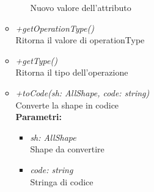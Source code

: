 \begin{itemize}
\begin{itemize}
\begin{itemize}
    			Nuovo valore dell'attributo
    		\end{itemize}
    		\item \emph{+getOperationType()}\\
    		Ritorna il valore di operationType
    		\item \emph{+getType()}\\
    		Ritorna il tipo dell'operazione
    		\item \emph{+toCode(sh: AllShape, code: string)}\\
    		Converte la shape in codice\\
    		\textbf{Parametri:}
    		\begin{itemize}
    			\item \emph{sh: AllShape}\\
    			Shape da convertire
    			\item \emph{code: string}\\
    			Stringa di codice
    		\end{itemize}
    	\end{itemize}
\end{itemize}